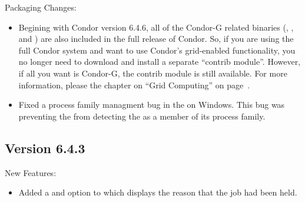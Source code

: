 \noindent Packaging Changes:

\begin{itemize}

\item Begining with Condor version 6.4.6, all of the Condor-G related
binaries (, , and
) are also included in the full release of Condor.
So, if you are using the full Condor system and want to use Condor's
grid-enabled functionality, you no longer need to download and install
a separate ``contrib module''.  
However, if all you want is Condor-G, the contrib module is still
available.
For more information, please the chapter on ``Grid Computing'' on
page~\pageref{grid-computing}.

\item Fixed a process family managment bug in the  on 
Windows. This bug was preventing the  from detecting
the  as a member of its process family.

\end{itemize}

\subsection{\label{sec:New-6-4-3}Version 6.4.3}

\noindent New Features:
\begin{itemize}

\item Added a  and  option to  which 
displays the reason that the job had been held.

\end{itemize}

